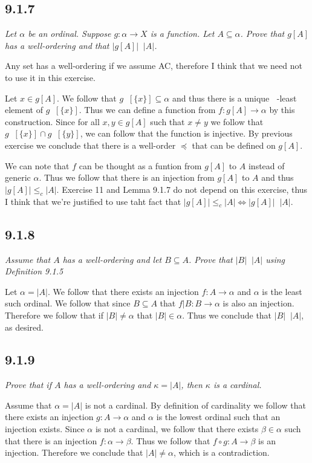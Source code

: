 \documentclass[11pt,oneside,titlepage]{book}
\DeclareMathOperator \inv {^{-1}}
\DeclareMathOperator \ineq {\underline{\in}}
\newcommand{\set}[1]{\{ #1 \}}
\begin{document}
\subsection*{9.1.7}

\textit{Let $\alpha$ be an ordinal. Suppose $g: \alpha \to X$ is a function.
  Let $A \subseteq \alpha$. Prove that $g[A]$ has a well-ordering and that $|g[A]| \ineq |A|$. }

Any set has a well-ordering if we assume AC, therefore I think that we need not to use
it in this exercise.

Let $x \in g[A]$. We follow that $g\inv[\set{x}] \subseteq \alpha$ and thus
there is a unique $\ineq$-least element of $g\inv[\set{x}]$. Thus we can define a function from
$f: g[A] \to \alpha$ by this construction.
Since for all $x, y \in g[A]$ such that $x \neq y$ we follow that
$g\inv[\set{x}] \cap  g\inv[\set{y}]$, we can follow that the function is injective. By previous
exercise we conclude that there is a well-order $\preceq$ that can be defined on $g[A]$.

We can note that $f$ can be thought as a funtion from $g[A]$ to $A$ instead of generic $\alpha$.
Thus we follow that there is an injection from $g[A]$ to $A$ and thus $|g[A]| \leq_c |A|$.
Exercise 11 and Lemma 9.1.7  do not depend on this exercise, thus I think that we're justified
to use taht fact that $|g[A]| \leq_c |A| \iff |g[A]| \ineq |A|$.

\subsection*{9.1.8}

\textit{Assume that $A$ has a well-ordering and let $B \subseteq A$. Prove that $|B| \ineq |A|$
  using Definition 9.1.5 }

Let $\alpha = |A|$. We follow that there exists an injection $f: A \to \alpha$ and $\alpha$ is the
least such ordinal. We follow that since $B \subseteq A$ that $f|B: B \to \alpha$
is also an injection. Therefore we follow that if $|B| \neq \alpha$ that $|B| \in \alpha$.
Thus we conclude that $|B| \ineq |A|$, as desired.

\subsection*{9.1.9}

\textit{Prove that if $A$ has a well-ordering and $\kappa = |A|$, then $\kappa$ is a
  cardinal.}

Assume that $\alpha = |A|$ is not a cardinal. By definition of cardinality we follow that
there exists an injection $g: A \to \alpha$ and $\alpha$ is the lowest ordinal such that
an injection exists. 
Since $\alpha$ is not a cardinal, we follow that there exists $\beta \in \alpha$
such that there is an injection $f: \alpha \to \beta$. Thus we follow that
$f \circ g: A \to \beta$ is an injection. Therefore we conclude that $|A| \neq \alpha$,
which is a contradiction.
\end{document}
